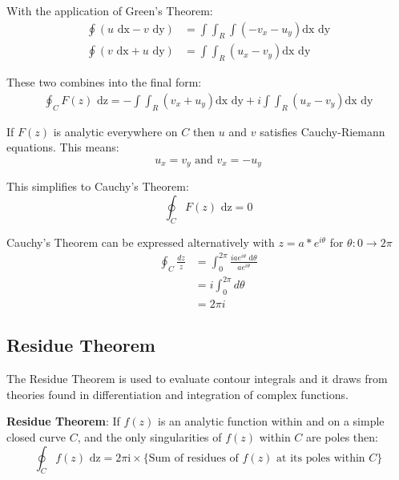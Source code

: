 \documentclass[10pt,a4paper]{article}
\begin{document}
With the application of Green's Theorem:
\begin{equation*} 
    \begin{aligned}
        \oint (u\text{ dx}-v\text{ dy}) &= \int \int_R \int (-v_x-u_y)\text{dx dy} \\
        \oint (v\text{ dx}+u\text{ dy}) &= \int \int_R (u_x-v_y)\text{dx dy}
    \end{aligned}
\end{equation*}

These two combines into the final form: 
\begin{equation*} 
    \begin{aligned}
        \oint_C F(z)\text{ dz} = -\int \int_R (v_x+u_y)\text{dx dy} + i\int \int_R (u_x - v_y)\text{dx dy}
    \end{aligned}
\end{equation*}

If $F(z)$ is analytic everywhere on $C$ then $u$ and $v$ satisfies Cauchy-Riemann equations. This
means:
\begin{equation*} 
u_x = v_y \text{   and   } v_x=-u_y
\end{equation*}

This simplifies to Cauchy's Theorem: 
$$
\oint_C F(z) \text{ dz} = 0
$$

Cauchy's Theorem can be expressed alternatively with $z=a*e^{i\theta}$ for $\theta:0\rightarrow
2\pi$
\begin{equation*} 
    \begin{aligned}
        \oint_C \frac{dz}{z} &= \int_0^{2\pi}\frac{iae^{i\theta}\text{ d}\theta}{ae^{i\theta}} \\
        &= i \int_0^{2\pi}d\theta \\
        &= 2\pi i
    \end{aligned}
\end{equation*} 

\pagebreak

\subsection{Residue Theorem}

The Residue Theorem is used to evaluate contour integrals and it draws from theories found in
differentiation and integration of complex functions.

\begin{tcolorbox}[breakable,colback=white]
\textbf{Residue Theorem}: If $f(z)$ is an analytic function within and on a simple closed curve $C$,
and the only singularities of $f(z)$ within $C$ are poles then:
$$
\oint_C f(z) \text{ dz} = 2\pi \text{i} \times \{\text{Sum of residues of $f(z)$ at its poles within $C$}\}
$$
\end{tcolorbox}
\end{document}
